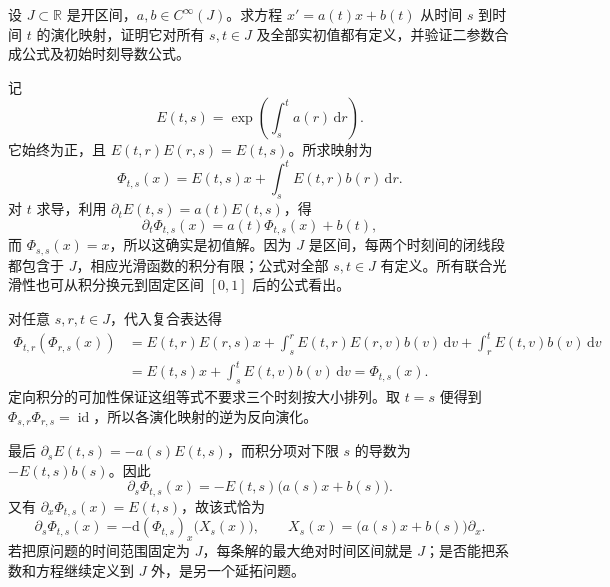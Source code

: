 \begin{exercise}\label{g1:ex:affine-time-dependent-evolution}
	设 \(J\subset\mathbb R\) 是开区间，\(a,b\in C^\infty(J)\)。求方程 \(x'=a(t)x+b(t)\) 从时间 \(s\) 到时间 \(t\) 的演化映射，证明它对所有 \(s,t\in J\) 及全部实初值都有定义，并验证二参数合成公式及初始时刻导数公式。
\end{exercise}
\begin{solution}
	记
	\[
		E(t,s)=\exp\left(\int_s^t a(r)\,\mathrm{d}r\right).
	\]
	它始终为正，且 \(E(t,r)E(r,s)=E(t,s)\)。所求映射为
	\[
		\Phi_{t,s}(x)=E(t,s)x+\int_s^t E(t,r)b(r)\,\mathrm{d}r.
	\]
	对 \(t\) 求导，利用 \(\partial_tE(t,s)=a(t)E(t,s)\)，得
	\[
		\partial_t\Phi_{t,s}(x)=a(t)\Phi_{t,s}(x)+b(t),
	\]
	而 \(\Phi_{s,s}(x)=x\)，所以这确实是初值解。因为 \(J\) 是区间，每两个时刻间的闭线段都包含于 \(J\)，相应光滑函数的积分有限；公式对全部 \(s,t\in J\) 有定义。所有联合光滑性也可从积分换元到固定区间 \([0,1]\) 后的公式看出。

	对任意 \(s,r,t\in J\)，代入复合表达得
	\[
		\begin{aligned}
		\Phi_{t,r}(\Phi_{r,s}(x))
		&=E(t,r)E(r,s)x+\int_s^r E(t,r)E(r,v)b(v)\,\mathrm{d}v
		+\int_r^t E(t,v)b(v)\,\mathrm{d}v\\
		&=E(t,s)x+\int_s^t E(t,v)b(v)\,\mathrm{d}v
		=\Phi_{t,s}(x).
		\end{aligned}
	\]
	定向积分的可加性保证这组等式不要求三个时刻按大小排列。取 \(t=s\) 便得到 \(\Phi_{s,r}\Phi_{r,s}=\operatorname{id}\)，所以各演化映射的逆为反向演化。

	最后 \(\partial_sE(t,s)=-a(s)E(t,s)\)，而积分项对下限 \(s\) 的导数为 \(-E(t,s)b(s)\)。因此
	\[
		\partial_s\Phi_{t,s}(x)
		=-E(t,s)\bigl(a(s)x+b(s)\bigr).
	\]
	又有 \(\partial_x\Phi_{t,s}(x)=E(t,s)\)，故该式恰为
	\[
		\partial_s\Phi_{t,s}(x)
		=-\mathrm{d}(\Phi_{t,s})_x\bigl(X_s(x)\bigr),\qquad
		X_s(x)=\bigl(a(s)x+b(s)\bigr)\partial_x.
	\]
	若把原问题的时间范围固定为 \(J\)，每条解的最大绝对时间区间就是 \(J\)；是否能把系数和方程继续定义到 \(J\) 外，是另一个延拓问题。
\end{solution}

